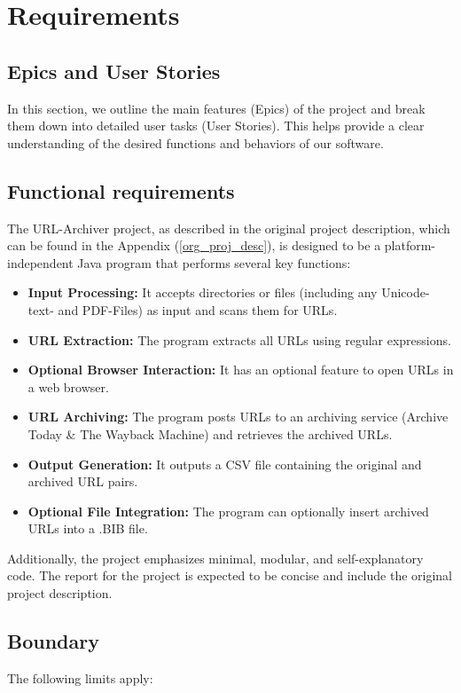 \section{Requirements}

\subsection{Epics and User Stories}
In this section, we outline the main features (\glspl{Epic}) of the project and break them down into detailed user tasks (User Stories). This helps provide a clear understanding of the desired functions and behaviors of our software.





\clearpage
\subsection{Functional requirements}
The URL-Archiver project, as described in the original project description, which can be found in the Appendix (\ref{org_proj_desc}), is designed to be a platform-independent Java program that performs several key functions:

\begin{itemize}
    \item \textbf{Input Processing:} It accepts directories or files (including any Unicode-text- and PDF-Files) as input and scans them for URLs.
    \item \textbf{URL Extraction:} The program extracts all URLs using regular expressions.
    \item \textbf{Optional Browser Interaction:} It has an optional feature to open URLs in a web browser.
    \item \textbf{URL Archiving:} The program posts URLs to an archiving service (Archive Today \& The Wayback Machine) and retrieves the archived URLs.
    \item \textbf{Output Generation:} It outputs a CSV file containing the original and archived URL pairs.
    \item \textbf{Optional File Integration:} The program can optionally insert archived URLs into a .BIB file.
\end{itemize}

Additionally, the project emphasizes minimal, modular, and self-explanatory code. The report for the project is expected to be concise and include the original project description.

\subsection{Boundary}
The following limits apply:

